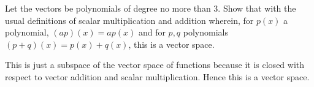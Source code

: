 \begin{ex} Let the vectors be polynomials of degree no more than 3. Show that
with the usual definitions of scalar multiplication and addition wherein,
for $p(x) $ a polynomial, $(a p) (
x) = a p(x) $ and for $p,q$ polynomials $(
p+q) (x) =  p(x) +q(x)$, this
is a vector space.
\begin{sol}
This is just a subspace of the vector space of functions
because it is closed with respect to vector addition and scalar
multiplication. Hence this is a vector space.
\end{sol}
\end{ex}

